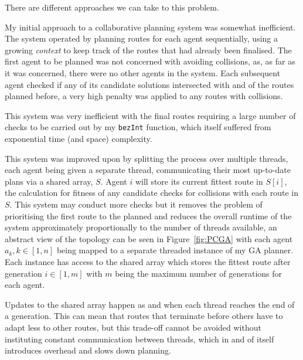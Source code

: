 There are different approaches we can take to this problem. 

My initial approach to a collaborative planning system was somewhat inefficient. The system operated by planning routes for each agent sequentially, using a growing \textit{context} to keep track of the routes that had already been finalised. The first agent to be planned was not concerned with avoiding collisions, as, as far as it was concerned, there were no other agents in the system. Each subsequent agent checked if any of its candidate solutions intersected with and of the routes planned before, a very high penalty was applied to any routes with collisions.

This system was very inefficient with the final routes requiring a large number of checks to be carried out by my \texttt{bezInt} function, which itself suffered from  exponential time (and space) complexity.

This system was improved upon by splitting the process over multiple threads, each agent being given a separate thread, communicating their most up-to-date plans via a shared array, $S$. Agent $i$ will store its current fittest route in $S[i]$, the calculation for fitness of any candidate checks for collisions with each route in $S$. This system may conduct more checks but it removes the problem of prioritising the first route to the planned and reduces the overall runtime of the system approximately proportionally to the number of threads available, an abstract view of the topology can be seen in Figure~\ref{fig:PCGA} with each agent $a_{k}, k \in [1,n]$ being mapped to a separate threaded instance of my GA planner. Each instance has access to the shared array which stores the fittest route after generation $i \in [1,m]$ with $m$ being the maximum number of generations for each agent.

Updates to the shared array happen as and when each thread reaches the end of a generation. This can mean that routes that terminate before others have to adapt less to other routes, but this trade-off cannot be avoided without instituting constant communication between threads, which in and of itself introduces overhead and slows down planning.


